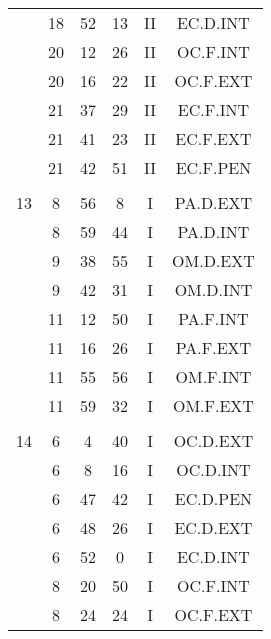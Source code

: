\documentclass[12pt, a4paper]{article}
\begin{document}
\begin{multicols}{3}
{\begin{tabular}{c c c c c c}
	 	 	 	 & 18 & 52 & 13 & II & EC.D.INT\\%
	 	 	 	 & 20 & 12 & 26 & II & OC.F.INT\\%
	 	 	 	 & 20 & 16 & 22 & II & OC.F.EXT\\%
	 	 	 	 & 21 & 37 & 29 & II & EC.F.INT\\%
	 	 	 	 & 21 & 41 & 23 & II & EC.F.EXT\\%
	 	 	 	 & 21 & 42 & 51 & II & EC.F.PEN\\%
	 	 	 	 & & & & & \\%
	 	 	 	13 & 8 & 56 & 8 & I & PA.D.EXT\\%
	 	 	 	 & 8 & 59 & 44 & I & PA.D.INT\\%
	 	 	 	 & 9 & 38 & 55 & I & OM.D.EXT\\%
	 	 	 	 & 9 & 42 & 31 & I & OM.D.INT\\%
	 	 	 	 & 11 & 12 & 50 & I & PA.F.INT\\%
	 	 	 	 & 11 & 16 & 26 & I & PA.F.EXT\\%
	 	 	 	 & 11 & 55 & 56 & I & OM.F.INT\\%
	 	 	 	 & 11 & 59 & 32 & I & OM.F.EXT\\%
	 	 	 	 & & & & & \\%
	 	 	 	14 & 6 & 4 & 40 & I & OC.D.EXT\\%
	 	 	 	 & 6 & 8 & 16 & I & OC.D.INT\\%
	 	 	 	 & 6 & 47 & 42 & I & EC.D.PEN\\%
	 	 	 	 & 6 & 48 & 26 & I & EC.D.EXT\\%
	 	 	 	 & 6 & 52 & 0 & I & EC.D.INT\\%
	 	 	 	 & 8 & 20 & 50 & I & OC.F.INT\\%
	 	 	 	 & 8 & 24 & 24 & I & OC.F.EXT\\%

\end{tabular}}
\end{multicols}
\end{document}
